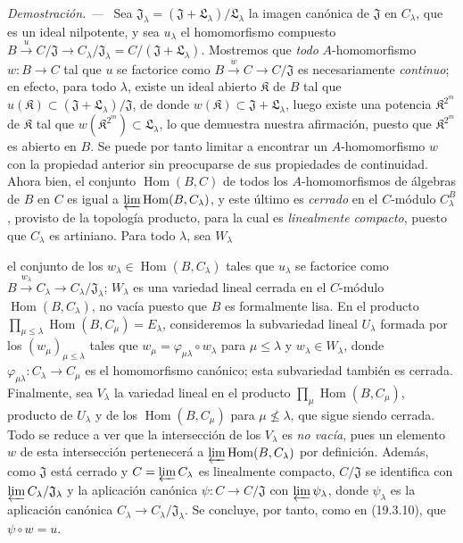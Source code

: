 \documentclass[10pt,oneside]{book}
\newcommand{\oldpage}[2][]{%
  \setcounter{footnote}{0}%
  \marginpar{\scriptsize\textbf{#1}~|~#2}\ignorespaces}
\newenvironment{proof}{%
  \par\medskip\noindent\textit{Demostración. ---\ }}{\par}
\begin{document}
\begin{proof}
Sea $\mathfrak J_\lambda=(\mathfrak J+\mathfrak L_\lambda)/\mathfrak L_\lambda$
la imagen canónica de $\mathfrak J$ en $C_\lambda$, que es un ideal
nilpotente, y sea $u_\lambda$ el homomorfismo compuesto
$B\xrightarrow{u}C/\mathfrak J\to C_\lambda/\mathfrak J_\lambda
=C/(\mathfrak J+\mathfrak L_\lambda)$. Mostremos que \emph{todo}
$A$-homomorfismo $w:B\to C$ tal que $u$ se factorice como
$B\xrightarrow{w}C\to C/\mathfrak J$ es necesariamente \emph{continuo}; en
efecto, para todo $\lambda$, existe un ideal abierto $\mathfrak K$ de $B$
tal que $u(\mathfrak K)\subset
(\mathfrak J+\mathfrak L_\lambda)/\mathfrak J$, de donde
$w(\mathfrak K)\subset\mathfrak J+\mathfrak L_\lambda$, luego existe
una potencia $\mathfrak K^{2^m}$ de $\mathfrak K$ tal que
$w(\mathfrak K^{2^m})\subset\mathfrak L_\lambda$, lo que demuestra
nuestra afirmación, puesto que $\mathfrak K^{2^m}$ es abierto en $B$. Se puede
por tanto limitar a encontrar un $A$-homomorfismo $w$ con la propiedad anterior
sin preocuparse de sus propiedades de continuidad. Ahora bien, el conjunto
$\operatorname{Hom}(B,C)$ de todos los $A$-homomorfismos de álgebras de $B$
en $C$ es igual a
$\varprojlim\operatorname{Hom}(B,C_\lambda)$, y este último es
\emph{cerrado} en el $C$-módulo $C_\lambda^B$, provisto de la topología
producto, para la cual es \emph{linealmente compacto}, puesto que
  $C_\lambda$ es artiniano. Para todo $\lambda$, sea $W_\lambda$

\oldpage[0\textsubscript{IV-1}]{86}

el conjunto de los $w_\lambda\in\operatorname{Hom}(B,C_\lambda)$ tales que
$u_\lambda$ se factorice como
$B\xrightarrow{w_\lambda}C_\lambda\to
C_\lambda/\mathfrak J_\lambda$; $W_\lambda$ es una variedad
lineal cerrada en el $C$-módulo
  $\operatorname{Hom}(B,C_\lambda)$, no vacía puesto que $B$ es formalmente
  lisa. En el producto
$\prod_{\mu\leq\lambda}\operatorname{Hom}(B,C_\mu)=E_\lambda$,
consideremos la subvariedad lineal $U_\lambda$ formada por los
$(w_\mu)_{\mu\leq\lambda}$ tales que
$w_\mu=\varphi_{\mu\lambda}\circ w_\lambda$ para
$\mu\leq\lambda$ y $w_\lambda\in W_\lambda$, donde
$\varphi_{\mu\lambda}:C_\lambda\to C_\mu$ es
el homomorfismo canónico; esta subvariedad también es cerrada. Finalmente, sea $V_\lambda$
la variedad lineal en el producto
$\prod_\mu\operatorname{Hom}(B,C_\mu)$, producto de $U_\lambda$
y de los $\operatorname{Hom}(B,C_\mu)$ para
$\mu\not\leq\lambda$, que sigue siendo cerrada. Todo se reduce a ver que
la intersección de los $V_\lambda$ es \emph{no vacía}, pues un elemento $w$ de
esta intersección pertenecerá a
$\varprojlim\operatorname{Hom}(B,C_\lambda)$ por definición.
Además, como $\mathfrak J$ está cerrado y
$C=\varprojlim C_\lambda$ es linealmente compacto,
$C/\mathfrak J$ se identifica con
$\varprojlim C_\lambda/\mathfrak J_\lambda$ y
la aplicación canónica $\psi:C\to C/\mathfrak J$ con
$\varprojlim\psi_\lambda$, donde $\psi_\lambda$ es
la aplicación canónica
$C_\lambda\to C_\lambda/\mathfrak J_\lambda$. Se concluye, por tanto,
como en (19.3.10), que $\psi\circ w=u$.
\end{proof}
\end{document}
